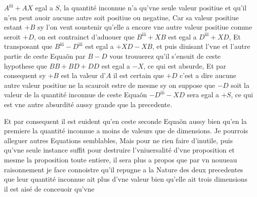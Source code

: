 \documentclass[11pt,a4paper]{article}
\begin{document}
$A^{\mathrm{iii}} + AX$ egal a $S$, la quantité inconnue n'a qu'vne seule valeur positiue et qu'il n'en peut auoir aucune autre soit positiue ou negatiue, Car sa valeur positiue estant $+B$ sy l'on veut soustenir qu'elle a encore vne autre valeur positiue comme seroit $+D$, on est contrainct d'aduouer que $B^{\mathrm{iii}} + XB$ est egal a $D^{\mathrm{iii}} + XD$, \struck{\ill{}} Et transposant que $B^{\mathrm{iii}} - D^{\mathrm{iii}}$ est egal a $+XD - XB$, et puis diuisant l'vne et l'autre partie de ceste Equaõn par $B - D$ vous trouuerez qu'il s'ensuit de ceste hypothese que $BB + BD + DD$ est egal a \struck{\ill{}} $-X$, ce qui est absurde, Et par consequent sy $+B$ est la valeur d'$A$ il est  certain que $+D$ c'est a dire aucune autre valeur positiue ne la scauroit estre de mesme sy on suppose que $-D$ soit la valeur de la quantité inconnue de ceste Equaõn $-D^{\mathrm{iii}} - XD$ sera egal a $+S$, ce qui est  vne autre absurdité aussy grande que la precedente.

Et par consequent il est euident qu'en ceste seconde Equaõn aussy bien qu'en la \struck{\ill{}} premiere la quantité inconnue a  moins de valeurs que de dimensions. Je pourrois alleguer \struck{\ill{}}  autres Equations semblables, Mais pour ne rien faire d'inutile, puis qu'vne seule instance suffit pour  destruire l'vniuersalité d'vne proposition et mesme la proposition toute entiere, il sera plus a propos que par vn nouueau raisonnement je face connoistre qu'il repugne a la Nature des deux precedentes que leur quantité inconnue ait plus d'vne valeur bien qu'elle ait trois dimensions il est aisé de conceuoir qu'vne

\end{document}
